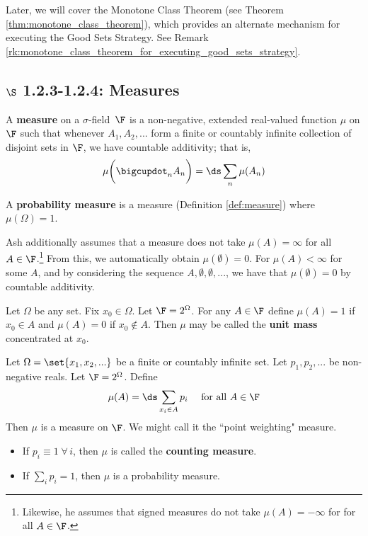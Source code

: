 \documentclass{article} %
\renewcommand{\sf}{$\sigma$-field}
\begin{document}
\begin{remark} 
Later, we will cover the Monotone Class Theorem (see Theorem \ref{thm:monotone_class_theorem}), which provides an alternate mechanism for executing the Good Sets Strategy.  See Remark \ref{rk:monotone_class_theorem_for_executing_good_sets_strategy}.
\end{remark}


\subsection{$\S$ 1.2.3-1.2.4: Measures}




\begin{definition}
A \textbf{measure} on a \sf\ $\F$ is a non-negative, extended real-valued function $\mu$ on $\F$ such that whenever $A_1, A_2, ...$ form a finite or countably infinite collection of disjoint sets in $\F$, we have countable additivity; that is,
\[ \mu \bigg( \bigcupdot_n A_n \bigg) = \ds\sum_n \mu(A_n) \]
\label{def:measure}	
\end{definition}

\begin{definition}
A \textbf{probability measure} is a measure (Definition \ref{def:measure}) where $\mu(\Omega)=1$.
\label{def:prob_measure}		
\end{definition}

\begin{remark}
Ash additionally assumes that a measure does not take $\mu(A) = \infty$ for all $A \in \F$.\footnote{Likewise, he assumes that signed measures do not take $\mu(A) = -\infty$ for  for all $A \in \F$.}  From this, we automatically obtain $\mu(\emptyset)=0$. For $\mu(A) < \infty$ for some $A$, and by considering the sequence $A, \emptyset, \emptyset, ...$, we have that $\mu(\emptyset)=0$ by countable additivity.   	
\end{remark}

\begin{example}
Let $\Omega$ be any set.  Fix $x_0 \in \Omega$.  Let $\F = 2^\Omega$.  For any $A \in \F$ define $\mu(A) = 1$ if $x_0 \in A$ and $\mu(A) = 0$ if $x_0 \not\in A$.  Then $\mu$ may be called the \textbf{unit mass} concentrated at $x_0$.
\end{example}

\begin{example}
Let $\Omega = \set{x_1,x_2,...}$ be a finite or countably infinite set.  Let $p_1, p_2,...$ be non-negative reals.  Let $\F = 2^\Omega$.  Define
\[\mu(A) = \ds\sum_{x_i \in A} p_i \quad \text{ for all } A \in \F\]
Then $\mu$ is a measure on $\F$. We might call it the ``point weighting" measure. 
\begin{itemize}
\item If $p_i \equiv 1 \; \forall \, i$, then $\mu$ is called the \textbf{counting measure}.
\item If $\sum_i p_i =1$, then $\mu$ is a probability measure.	
\end{itemize}
	
\end{example}
\end{document}
